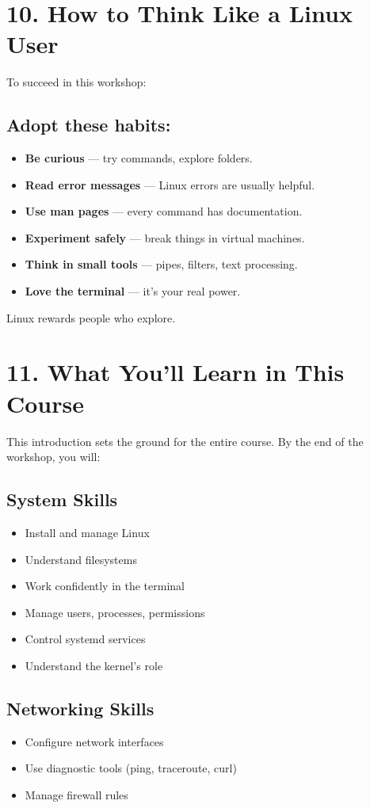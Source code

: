 \documentclass[12pt]{article}
\begin{document}
\section*{10. How to Think Like a Linux User}

To succeed in this workshop:

\subsection*{Adopt these habits:}
\begin{itemize}
    \item \textbf{Be curious} — try commands, explore folders.
    \item \textbf{Read error messages} — Linux errors are usually helpful.
    \item \textbf{Use man pages} — every command has documentation.
    \item \textbf{Experiment safely} — break things in virtual machines.
    \item \textbf{Think in small tools} — pipes, filters, text processing.
    \item \textbf{Love the terminal} — it's your real power.
\end{itemize}

Linux rewards people who explore.

\section*{11. What You'll Learn in This Course}

This introduction sets the ground for the entire course. By the end of the workshop, you will:

\subsection*{System Skills}
\begin{itemize}
    \item Install and manage Linux
    \item Understand filesystems
    \item Work confidently in the terminal
    \item Manage users, processes, permissions
    \item Control systemd services
    \item Understand the kernel's role
\end{itemize}

\subsection*{Networking Skills}
\begin{itemize}
    \item Configure network interfaces
    \item Use diagnostic tools (ping, traceroute, curl)
    \item Manage firewall rules
\end{itemize}
\end{document}

